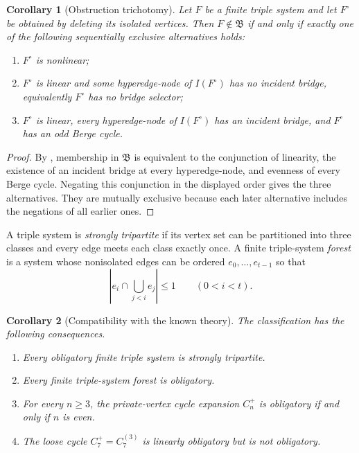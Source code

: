 \documentclass[11pt]{amsart}
\newtheorem{corollary}[corollary]{Corollary}
\theoremstyle{definition}
\theoremstyle{remark}
\numberwithin{equation}{section}
\newcommand{\Bclass}{\mathfrak B}
\begin{document}
\begin{corollary}[Obstruction trichotomy]
\label{cor:obstruction-trichotomy}
Let $F$ be a finite triple system and let $F^\circ$ be obtained by deleting
its isolated vertices.  Then $F\notin\Bclass$ if and only if exactly one of
the following sequentially exclusive alternatives holds:
\begin{enumerate}[label=\textup{(\roman*)}]
\item $F^\circ$ is nonlinear;
\item $F^\circ$ is linear and some hyperedge-node of $I(F^\circ)$ has no
incident bridge, equivalently $F^\circ$ has no bridge selector;
\item $F^\circ$ is linear, every hyperedge-node of $I(F^\circ)$ has an
incident bridge, and $F^\circ$ has an odd Berge cycle.
\end{enumerate}
\end{corollary}

\begin{proof}
By , membership in $\Bclass$ is equivalent
to the conjunction of linearity, the existence of an incident bridge at
every hyperedge-node, and evenness of every Berge cycle.  Negating this
conjunction in the displayed order gives the three alternatives.  They
are mutually exclusive because each later alternative includes the
negations of all earlier ones.
\end{proof}

A triple system is \emph{strongly tripartite} if its vertex set can be
partitioned into three classes and every edge meets each class exactly
once.  A finite triple-system \emph{forest} is a system whose nonisolated
edges can be ordered $e_0,\ldots,e_{t-1}$ so that
\[
  \left|e_i\cap\bigcup_{j<i}e_j\right|\le1
  \qquad(0<i<t).
\]

\begin{corollary}[Compatibility with the known theory]
\label{cor:compatibility}
The classification has the following consequences.
\begin{enumerate}
\item Every obligatory finite triple system is strongly tripartite.
\item Every finite triple-system forest is obligatory.
\item For every $n\ge3$, the private-vertex cycle expansion $C_n^+$ is
obligatory if and only if $n$ is even.
\item The loose cycle $C_7^+=C_7^{(3)}$ is linearly obligatory but is not
obligatory.
\end{enumerate}
\end{corollary}
\end{document}
